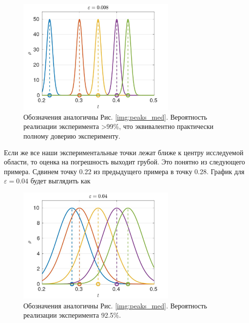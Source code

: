 \documentclass[a4paper,12pt]{article} %
\begin{document}
\begin{figure}[h!]
\begin{center}
\includegraphics[width=0.7\textwidth]{./pics/peaks_sharp_med}
\end{center}
\caption{Обозначения аналогичны Рис. \ref{img:peaks_med}. Вероятность реализации эксперимента >99\%, что эквивалентно практически полному доверию эксперименту.} \label{img:peaks_sharp_med}
\end{figure}

\newpage

Если же все наши экспериментальные точки лежат ближе к центру исследуемой области, то оценка на погрешность выходит грубой. Это понятно из следующего примера. Сдвинем точку 0.22 из предыдущего примера в точку 0.28. График для $\varepsilon = 0.04$ будет выглядить как

\begin{figure}[h!]
\begin{center}
\includegraphics[width=0.7\textwidth]{./pics/peaks_smooth}
\end{center}
\caption{Обозначения аналогичны Рис. \ref{img:peaks_med}. Вероятность реализации эксперимента 92.5\%.} \label{img:peaks_smooth}
\end{figure}
\end{document}
